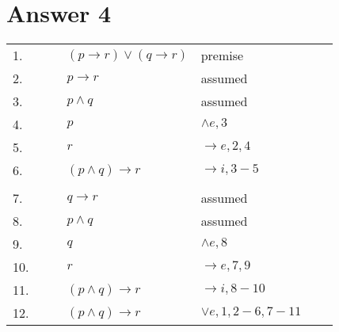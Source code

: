 \documentclass[12pt]{article}
\begin{document}
\section*{Answer 4}
\begin{table}[H]
	\centering
	\begin{tabular}{lllllll}
		1. & & & $(p \rightarrow r) \vee (q \rightarrow r)$ & premise & & \\ \cline{3-7}
		2. & \multicolumn{1}{c|}{} & & $p \rightarrow r$ & assumed & & \multicolumn{1}{c|}{} \\ \cline{4-6}
		3. & \multicolumn{1}{c|}{} & \multicolumn{1}{c|}{} & $p \wedge q$ & assumed & \multicolumn{1}{c|}{} & \multicolumn{1}{c|}{} \\
		4. & \multicolumn{1}{c|}{} & \multicolumn{1}{c|}{} & $p$ & $\wedge e, 3$ & \multicolumn{1}{c|}{} & \multicolumn{1}{c|}{} \\
		5. & \multicolumn{1}{c|}{} & \multicolumn{1}{c|}{} & $r$ & $\rightarrow e,  2, 4$ & \multicolumn{1}{c|}{} & \multicolumn{1}{c|}{} \\ \cline{4-6}
		6. & \multicolumn{1}{c|}{} & & $(p \wedge q) \rightarrow r$ & $\rightarrow i, 3-5$ & & \multicolumn{1}{c|}{} \\ \cline{3-7} \\ \cline{3-7}
		7. & \multicolumn{1}{c|}{} & & $q \rightarrow r$ & assumed & & \multicolumn{1}{c|}{} \\ \cline{4-6}
		8. & \multicolumn{1}{c|}{} & \multicolumn{1}{c|}{} & $p \wedge q$ & assumed & \multicolumn{1}{c|}{} & \multicolumn{1}{c|}{} \\
		9. & \multicolumn{1}{c|}{} & \multicolumn{1}{c|}{} & $q$ & $\wedge e, 8$ & \multicolumn{1}{c|}{} & \multicolumn{1}{c|}{} \\
		10. & \multicolumn{1}{c|}{} & \multicolumn{1}{c|}{} & $r$ & $\rightarrow e, 7, 9$ & \multicolumn{1}{c|}{} & \multicolumn{1}{c|}{} \\ \cline{4-6}
		11. & \multicolumn{1}{c|}{} & & $(p \wedge q) \rightarrow r$ & $\rightarrow i, 8-10$ & & \multicolumn{1}{c|}{} \\ \cline{3-7}
		12. & & & $(p \wedge q) \rightarrow r$ & $\vee e, 1, 2-6, 7-11$ & & \\
		
	\end{tabular}
\end{table}
\end{document}
